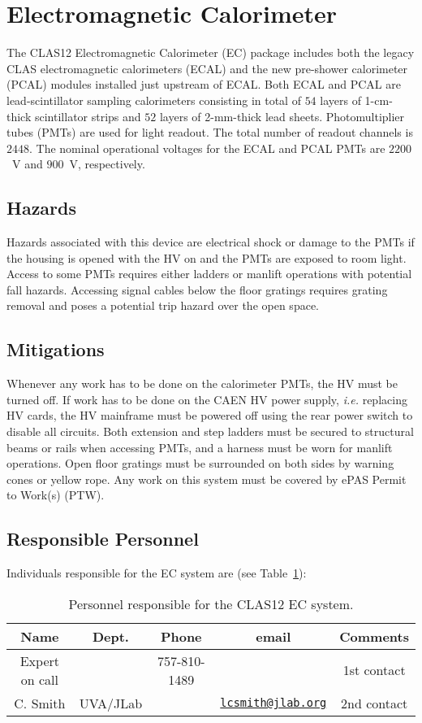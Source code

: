 \section{Electromagnetic Calorimeter}

The CLAS12 Electromagnetic Calorimeter (EC) package includes both the legacy CLAS 
electromagnetic calorimeters (ECAL) and the new pre-shower calorimeter (PCAL) modules 
installed just upstream of ECAL. Both ECAL and PCAL are lead-scintillator sampling 
calorimeters consisting in total of $54$ layers of 1-cm-thick scintillator strips and 
$52$ layers of 2-mm-thick lead sheets. Photomultiplier tubes (PMTs) are used for light 
readout. The total number of readout channels is $2448$. The nominal operational voltages 
for the ECAL and PCAL PMTs are $2200$~V and $900$~V, respectively. 

\subsection{Hazards} 

Hazards associated with this device are electrical shock or damage to the PMTs if the 
housing is opened with the HV on and the PMTs are exposed to room light.  Access to some 
PMTs requires either ladders or manlift operations with potential fall hazards. Accessing 
signal cables below the floor gratings requires grating removal and poses a potential trip 
hazard over the open space. 

\subsection{Mitigations}

Whenever any work has to be done on the calorimeter PMTs, the HV must be turned off. If work 
has to be done on the CAEN HV power supply, {\it i.e.} replacing HV cards, the HV mainframe must 
be powered off using the rear power switch to disable all circuits. Both extension and step 
ladders must be secured to structural beams or rails when accessing PMTs, and a harness must 
be worn for manlift operations. Open floor gratings must be surrounded on both sides by 
warning cones or yellow rope.  Any work on this system must be covered by ePAS Permit to Work(s) (PTW).

\subsection{Responsible Personnel}

Individuals responsible for the EC system are (see Table~\ref{tb:ec}):

\begin{table}[!htb]
\centering
\begin{tabular}{|c|c|c|c|c|} \hline
Name&Dept.&Phone&email&Comments \\ \hline
Expert on call& &757-810-1489&& 1st contact \\ \hline
C. Smith &UVA/JLab&&\href{mailto:lcsmith@jlab.org}{\nolinkurl{lcsmith@jlab.org}}&2nd contact \\ \hline
\end{tabular}
\caption{Personnel responsible for the CLAS12 EC system.} 
\label{tb:ec}
\end{table}

